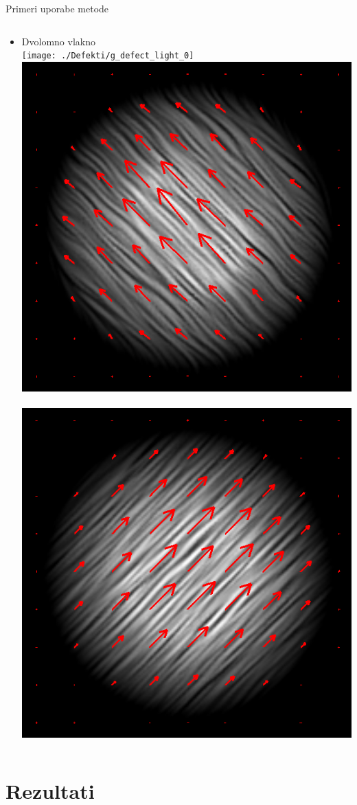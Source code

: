 \documentclass{beamer}
\begin{document}
\begin{frame}{Primeri uporabe metode}
\begin{columns}[c]
\begin{column}[T]{.5\textwidth}
\begin{itemize}
 \item Dvolomno vlakno \\
  \hspace{-0.6cm}
  \texttt{[image: ./Defekti/g\_defect\_light\_0]} \,
  \includegraphics[width=.29\textwidth]{./Slike/licp_0_68} \,
  \includegraphics[width=.29\textwidth]{./Slike/licp_0_78}
\end{itemize}

\end{column}

\end{columns}

\end{frame}

\section{Rezultati}
\end{document}
